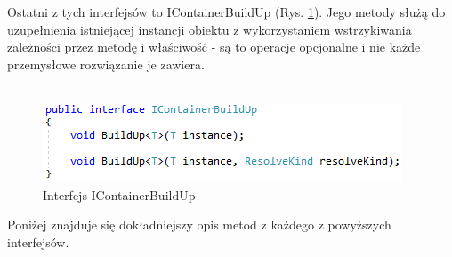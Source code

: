 \documentclass[12pt]{article}
\begin{document}
Ostatni z tych interfejsów to IContainerBuildUp (Rys. \ref{fig:IContainerBuildUp}). Jego metody służą do uzupełnienia istniejącej instancji obiektu z wykorzystaniem wstrzykiwania zależności przez metodę i właściwość - są to operacje opcjonalne i nie każde przemysłowe rozwiązanie je zawiera.\\ \\
\begin{figure}[H]
	\begin{center}
  		\includegraphics{IContainerBuildUp.png}
  		\caption{Interfejs IContainerBuildUp}
  		\label{fig:IContainerBuildUp}
	\end{center}
\end{figure}
Poniżej znajduje się dokładniejszy opis metod z każdego z powyższych interfejsów.
\end{document}
